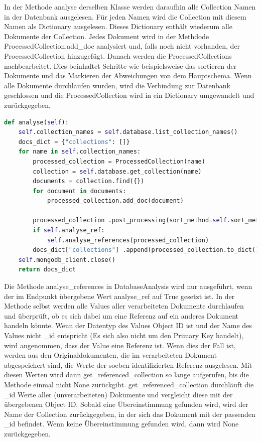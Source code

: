 In der Methode analyse derselben Klasse werden daraufhin alle Collection Namen in der Datenbank ausgelesen.
Für jeden Namen wird die Collection mit diesem Namen als Dictionary ausgelesen.
Dieses Dictionary enthält wiederum alle Dokumente der Collection.
Jedes Dokument wird in der Methdode ProcessedCollection.add\_doc analysiert und, falls noch nicht vorhanden, der ProcessedCollection hinzugefügt.
Danach werden die ProcessedCollections nachbearbeitet.
Dies beinhaltet Schritte wie beispielsweise das sortieren der Dokumente und das Markieren der Abweichungen von dem Hauptschema.
Wenn alle Dokumente durchlaufen wurden, wird die Verbindung zur Datenbank geschlossen und die ProcessedCollection wird in ein Dictionary umgewandelt und zurückgegeben.

\begin{lstlisting}[language=python, caption={DatabaseAnalysis.analyse},label={lst:backend_analyse}]
def analyse(self):
    self.collection_names = self.database.list_collection_names()
    docs_dict = {"collections": []}
    for name in self.collection_names:
        processed_collection = ProcessedCollection(name)
        collection = self.database.get_collection(name)
        documents = collection.find({})
        for document in documents:
            processed_collection.add_doc(document)

        processed_collection .post_processing(sort_method=self.sort_method)
        if self.analyse_ref:
            self.analyse_references(processed_collection)
        docs_dict["collections"] .append(processed_collection.to_dict())
    self.mongodb_client.close()
    return docs_dict
\end{lstlisting}

Die Methode analyse\_references in DatabaseAnalysis wird nur ausgeführt, wenn der im Endpunkt übergebene Wert analyse\_ref auf True gesetzt ist.
In der Methode selbst werden alle Values aller verarbeiteten Dokumente durchlaufen und überprüft, ob es sich dabei um eine Referenz auf ein anderes Dokument handeln könnte.
Wenn der Datentyp des Values Object ID ist und der Name des Values nicht \_id entspricht (Es sich also nicht um den Primary Key handelt), wird angenommen, dass der Value eine Referenz ist.
Wenn dies der Fall ist, werden aus den Originaldokumenten, die im verarbeiteten Dokument abgespeichert sind, die Werte der soeben identifizierten Referenz ausgelesen.
Mit diesen Werten wird dann get\_referenced\_collection so lange aufgerufen, bis die Methode einmal nicht None zurückgibt.
get\_referenced\_collection durchläuft die \_id Werte aller (unverarbeiteten) Dokumente und vergleicht diese mit der übergebenen Object ID.
Sobald eine Übereinstimmung gefunden wird, wird der Name der Collection zurückgegeben, in der sich das Dokument mit der passenden \_id befindet.
Wenn keine Übereinstimmung gefunden wird, dann wird None zurückgegeben.

